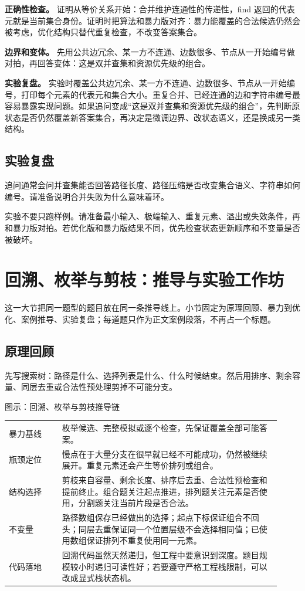 \textbf{正确性检查。} 证明从等价关系开始：合并维护连通性的传递性，find 返回的代表元就是当前集合身份。证明时把算法和暴力版对齐：暴力能覆盖的合法候选仍然会被考虑，优化结构只替代重复检查，不改变答案集合。

\textbf{边界和变体。} 先用公共边冗余、某一方不连通、边数很多、节点从一开始编号做对拍，再回答变体：这是双并查集和资源优先级的组合。

\textbf{实验复盘。} 实验时覆盖公共边冗余、某一方不连通、边数很多、节点从一开始编号，打印每个元素的代表元和集合大小。重复合并、已经连通的边和字符串编号最容易暴露实现问题。如果追问变成“这是双并查集和资源优先级的组合”，先判断原状态是否仍然覆盖新答案集合，再决定是微调边界、改状态语义，还是换成另一类结构。

\subsection{实验复盘}

追问通常会问并查集能否回答路径长度、路径压缩是否改变集合语义、字符串如何编号。请准备说明合并失败为什么意味着环。

实验不要只跑样例。请准备最小输入、极端输入、重复元素、溢出或失效条件，再和暴力版对拍。若优化版和暴力版结果不同，优先检查状态更新顺序和不变量是否被破坏。

\section{回溯、枚举与剪枝：推导与实验工作坊}
这一大节把同一题型的题目放在同一条推导线上。小节固定为原理回顾、暴力到优化、案例推导、实验复盘；每道题只作为正文案例段落，不再占一个标题。

\subsection{原理回顾}

先写搜索树：路径是什么、选择列表是什么、什么时候结束。然后用排序、剩余容量、同层去重或合法性预处理剪掉不可能分支。

\begin{principlebox}{图示：回溯、枚举与剪枝推导链}
\begin{tabular}{@{}p{0.18\linewidth}p{0.74\linewidth}@{}}
暴力基线 & 枚举候选、完整模拟或逐个检查，先保证覆盖全部可能答案。\\
瓶颈定位 & 慢点在于大量分支在很早就已经不可能成功，仍然被继续展开。重复元素还会产生等价排列或组合。\\
结构选择 & 剪枝来自容量、剩余长度、排序后去重、合法性预检查和提前终止。组合题关注起点推进，排列题关注元素是否使用，分割题关注当前片段是否合法。\\
不变量 & 路径数组保存已经做出的选择；起点下标保证组合不回头；同层去重保证同一个位置层级不会选择相同值；已使用数组保证排列不重复使用同一元素。\\
代码落地 & 回溯代码虽然天然递归，但工程中要意识到深度。题目规模较小时递归可读性好；若要遵守严格工程栈限制，可以改成显式栈状态机。\\
\end{tabular}
\end{principlebox}

